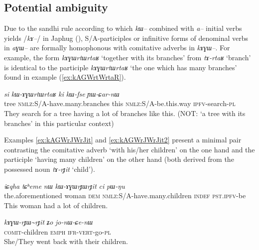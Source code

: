 \documentclass[oldfontcommands,oneside,a4paper,11pt]{article}
\newcommand{\ipa}[1]{{\phon\textit{#1}}} %
\newcommand{\tld}{\textasciitilde{}}
\begin{document}
\subsection{Potential ambiguity}
Due to the sandhi rule according to which \ipa{kɯ--} combined with \ipa{a--} initial verbs yields /\ipa{kɤ--}/ in Japhug (\citealt{jacques04these}), S/A-participles or infinitive forms of denominal verbs in \ipa{aɣɯ--} are formally homophonous with comitative adverbs in \ipa{kɤɣɯ--}. For example, the form \ipa{kɤɣɯrtɯrtaʁ}  `together with its branches' from \ipa{tɤ-rtaʁ} `branch' is identical to the participle \ipa{kɤɣɯrtɯrtaʁ} `the one which has many branches' found in example (\ref{ex:kAGWrtWrtaR}).

  \begin{exe}
\ex \label{ex:kAGWrtWrtaR}
\gll   
  \ipa{si} 	\ipa{kɯ-ɤɣɯrtɯrtaʁ} 	\ipa{ki} 	\ipa{kɯ-fse} 	\ipa{ɲɯ-ɕar-nɯ} \\
  tree \textsc{nmlz}:S/A-have.many.branches this \textsc{nmlz}:S/A-be.this.way \textsc{ipfv}-search-\textsc{pl} \\
\glt They search for a tree having a lot of branches like this. (NOT: `a tree with its branches' in this particular context)
\end{exe}

Examples \ref{ex:kAGWrJWrJit} and \ref{ex:kAGWrJWrJit2} present a minimal pair contrasting the comitative adverb  `with his/her children' on the one hand and the participle  `having many children' on the other hand (both derived from the possessed noun  \ipa{tɤ-rɟit} `child').

\begin{exe}
\ex \label{ex:kAGWrJWrJit}
\gll   
\ipa{iɕqha} 	\ipa{tɕʰeme} 	\ipa{nɯ} 	\ipa{kɯ-ɤɣɯrɟɯrɟit} 	\ipa{ci} 	\ipa{pɯ-ŋu}  \\
the.aforementioned woman \textsc{dem} \textsc{nmlz}:S/A-have.many.children \textsc{indef} \textsc{pst.ipfv}-be \\
\glt This woman had a lot of children.
\end{exe}

\begin{exe}
\ex \label{ex:kAGWrJWrJit2}
\gll   
\ipa{kɤɣɯ-rɟɯ\tld{}rɟit} 	\ipa{ʑo} 	\ipa{jo-nɯ-ɕe-nɯ} \\
\textsc{comit}-children \textsc{emph} \textsc{ifr-vert}-go-\textsc{pl} \\
\glt She/They went back with their children.
\end{exe}
\end{document}
